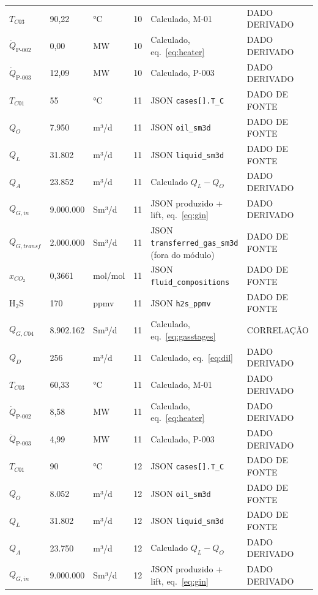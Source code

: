 \documentclass[11pt,a4paper]{article}
\numberwithin{equation}{section}
\numberwithin{table}{section}
\numberwithin{figure}{section}
\newcommand{\tipo}[1]{\textsf{\footnotesize #1}}
\begin{document}
{\begin{longtable}{L{3.6cm}L{2.2cm}lL{1.0cm}L{4.2cm}l}
$T_{C03}$ & 90,22 & °C & 10 & Calculado, M-01 & \tipo{DADO DERIVADO}\\
$\dot Q_{\mbox{P-002}}$ & 0,00 & MW & 10 & Calculado, eq.~\eqref{eq:heater} & \tipo{DADO DERIVADO}\\
$\dot Q_{\mbox{P-003}}$ & 12,09 & MW & 10 & Calculado, P-003 & \tipo{DADO DERIVADO}\\
$T_{C01}$ & 55 & °C & 11 & JSON \texttt{cases[].T\_C} & \tipo{DADO DE FONTE}\\
$Q_{O}$ & 7.950 & m³/d & 11 & JSON \texttt{oil\_sm3d} & \tipo{DADO DE FONTE}\\
$Q_{L}$ & 31.802 & m³/d & 11 & JSON \texttt{liquid\_sm3d} & \tipo{DADO DE FONTE}\\
$Q_{A}$ & 23.852 & m³/d & 11 & Calculado $Q_L-Q_O$ & \tipo{DADO DERIVADO}\\
$Q_{G,in}$ & 9.000.000 & Sm³/d & 11 & JSON produzido + lift, eq.~\eqref{eq:gin} & \tipo{DADO DERIVADO}\\
$Q_{G,transf}$ & 2.000.000 & Sm³/d & 11 & JSON \texttt{transferred\_gas\_sm3d} (fora do módulo) & \tipo{DADO DE FONTE}\\
$x_{CO_2}$ & 0{,}3661 & mol/mol & 11 & JSON \texttt{fluid\_compositions} & \tipo{DADO DE FONTE}\\
H$_2$S & 170 & ppmv & 11 & JSON \texttt{h2s\_ppmv} & \tipo{DADO DE FONTE}\\
$Q_{G,C04}$ & 8.902.162 & Sm³/d & 11 & Calculado, eq.~\eqref{eq:gasstages} & \tipo{CORRELAÇÃO}\\
$Q_{D}$ & 256 & m³/d & 11 & Calculado, eq.~\eqref{eq:dil} & \tipo{DADO DERIVADO}\\
$T_{C03}$ & 60,33 & °C & 11 & Calculado, M-01 & \tipo{DADO DERIVADO}\\
$\dot Q_{\mbox{P-002}}$ & 8,58 & MW & 11 & Calculado, eq.~\eqref{eq:heater} & \tipo{DADO DERIVADO}\\
$\dot Q_{\mbox{P-003}}$ & 4,99 & MW & 11 & Calculado, P-003 & \tipo{DADO DERIVADO}\\
$T_{C01}$ & 90 & °C & 12 & JSON \texttt{cases[].T\_C} & \tipo{DADO DE FONTE}\\
$Q_{O}$ & 8.052 & m³/d & 12 & JSON \texttt{oil\_sm3d} & \tipo{DADO DE FONTE}\\
$Q_{L}$ & 31.802 & m³/d & 12 & JSON \texttt{liquid\_sm3d} & \tipo{DADO DE FONTE}\\
$Q_{A}$ & 23.750 & m³/d & 12 & Calculado $Q_L-Q_O$ & \tipo{DADO DERIVADO}\\
$Q_{G,in}$ & 9.000.000 & Sm³/d & 12 & JSON produzido + lift, eq.~\eqref{eq:gin} & \tipo{DADO DERIVADO}\\

\end{longtable}}
\end{document}
